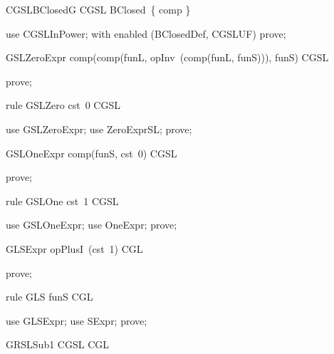 \documentclass{article}
\begin{document}
\begin{theorem}{CGSLBClosedG}
  CGSL \in BClosed~\{ comp \}
\end{theorem}

\begin{zproof}
use CGSLInPower;
with enabled (BClosedDef, CGSLUF) prove;
\end{zproof}

\begin{theorem}{GSLZeroExpr}
  comp(comp(funL, opInv~(comp(funL, funS))), funS) \in CGSL
\end{theorem}

\begin{zproof}
prove;
\end{zproof}

\begin{theorem}{rule GSLZero}
  cst~0 \in CGSL
\end{theorem}

\begin{zproof}
use GSLZeroExpr;
use ZeroExprSL;
prove;
\end{zproof}

\begin{theorem}{GSLOneExpr}
  comp(funS, cst~0) \in CGSL
\end{theorem}

\begin{zproof}
prove;
\end{zproof}

\begin{theorem}{rule GSLOne}
  cst~1 \in CGSL
\end{theorem}

\begin{zproof}
use GSLOneExpr;
use OneExpr;
prove;
\end{zproof}

\begin{theorem}{GLSExpr}
  opPlusI~(cst~1) \in CGL
\end{theorem}

\begin{zproof}
prove;
\end{zproof}

\begin{theorem}{rule GLS}
  funS \in CGL
\end{theorem}

\begin{zproof}
use GLSExpr;
use SExpr;
prove;
\end{zproof}

\begin{theorem}{GRSLSub1}
  CGSL \subseteq CGL
\end{theorem}
\end{document}
